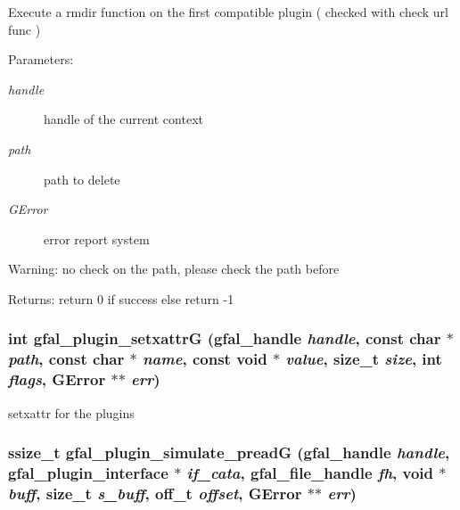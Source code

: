 Execute a rmdir function on the first compatible plugin ( checked with check url func ) \begin{Desc}
\item[Parameters:]
\begin{description}
\item[{\em handle}]handle of the current context \item[{\em path}]path to delete \item[{\em GError}]error report system \end{description}
\end{Desc}
\begin{Desc}
\item[Warning:]no check on the path, please check the path before \end{Desc}
\begin{Desc}
\item[Returns:]return 0 if success else return -1 \end{Desc}
\subsubsection{\setlength{\rightskip}{0pt plus 5cm}int gfal\_\-plugin\_\-setxattr\-G (gfal\_\-handle {\em handle}, const char $\ast$ {\em path}, const char $\ast$ {\em name}, const void $\ast$ {\em value}, size\_\-t {\em size}, int {\em flags}, GError $\ast$$\ast$ {\em err})}\label{gfal__common__plugin_8c_5bba59659f7b0e1a123db9d8b990b58c}


setxattr for the plugins 
\subsubsection{\setlength{\rightskip}{0pt plus 5cm}ssize\_\-t gfal\_\-plugin\_\-simulate\_\-pread\-G (gfal\_\-handle {\em handle}, \bf{gfal\_\-plugin\_\-interface} $\ast$ {\em if\_\-cata}, gfal\_\-file\_\-handle {\em fh}, void $\ast$ {\em buff}, size\_\-t {\em s\_\-buff}, off\_\-t {\em offset}, GError $\ast$$\ast$ {\em err})\hspace{0.3cm}{\tt  [inline]}}\label{gfal__common__plugin_8c_bef78cd24b45fd68c77cba088347d0c2}


